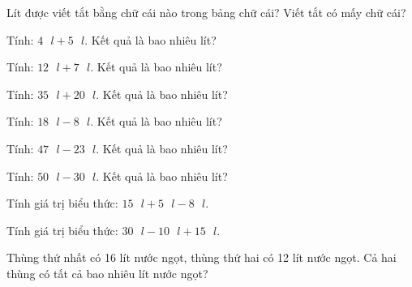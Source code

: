 \begin{ex}
Lít được viết tắt bằng chữ cái nào trong bảng chữ cái? Viết tắt có mấy chữ cái?
\end{ex}

\begin{ex}
Tính: $4\text{ }l + 5\text{ }l$. Kết quả là bao nhiêu lít?
\end{ex}

\begin{ex}
Tính: $12\text{ }l + 7\text{ }l$. Kết quả là bao nhiêu lít?
\end{ex}

\begin{ex}
Tính: $35\text{ }l + 20\text{ }l$. Kết quả là bao nhiêu lít?
\end{ex}

\begin{ex}
Tính: $18\text{ }l - 8\text{ }l$. Kết quả là bao nhiêu lít?
\end{ex}

\begin{ex}
Tính: $47\text{ }l - 23\text{ }l$. Kết quả là bao nhiêu lít?
\end{ex}

\begin{ex}
Tính: $50\text{ }l - 30\text{ }l$. Kết quả là bao nhiêu lít?
\end{ex}

\begin{ex}
Tính giá trị biểu thức: $15\text{ }l + 5\text{ }l - 8\text{ }l$.
\end{ex}

\begin{ex}
Tính giá trị biểu thức: $30\text{ }l - 10\text{ }l + 15\text{ }l$.
\end{ex}

\begin{ex}
Thùng thứ nhất có 16 lít nước ngọt, thùng thứ hai có 12 lít nước ngọt. Cả hai thùng có tất cả bao nhiêu lít nước ngọt?
\end{ex}

